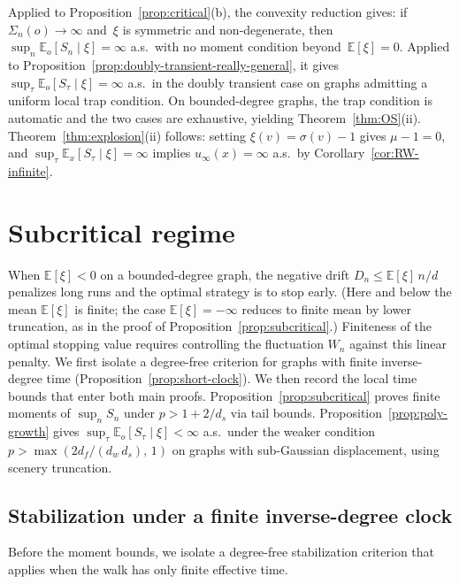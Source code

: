 \documentclass[aop]{imsart}
\theoremstyle{plain}
\theoremstyle{definition}
\newcommand{\E}{\mathbb{E}}
\begin{document}
	Applied to Proposition~\ref{prop:critical}(b), the convexity reduction gives: if~$\Sigma_n(o)\to\infty$ and~$\xi$ is symmetric and non-degenerate, then~$\sup_n\E_o[S_n\mid\xi]=\infty$ a.s.\ with no moment condition beyond~$\E[\xi]=0$.  Applied to Proposition~\ref{prop:doubly-transient-really-general}, it gives~$\sup_\tau\E_o[S_\tau\mid\xi]=\infty$ a.s.\ in the doubly transient case on graphs admitting a uniform local trap condition.  On bounded-degree graphs, the trap condition is automatic and the two cases are exhaustive, yielding Theorem~\ref{thm:OS}(ii).  Theorem~\ref{thm:explosion}(ii) follows: setting $\xi(v)=\sigma(v)-1$ gives $\mu-1=0$, and $\sup_{\tau}\E_x[S_\tau\mid\xi]=\infty$ implies $u_\infty(x)=\infty$ a.s.\ by Corollary~\ref{cor:RW-infinite}.
	
	\section{Subcritical regime}\label{sec:subcritical}
	
	When $\E[\xi]<0$ on a bounded-degree graph, the negative drift $D_n\leq\E[\xi]\,n/d$ penalizes long runs and the optimal strategy is to stop early. (Here and below the mean $\E[\xi]$ is finite; the case $\E[\xi]=-\infty$ reduces to finite mean by lower truncation, as in the proof of Proposition~\ref{prop:subcritical}.) Finiteness of the optimal stopping value requires controlling the fluctuation $W_n$ against this linear penalty. We first isolate a degree-free criterion for graphs with finite inverse-degree time (Proposition~\ref{prop:short-clock}). We then record the local time bounds that enter both main proofs. Proposition~\ref{prop:subcritical} proves finite moments of $\sup_n S_n$ under $p>1+2/d_s$ via tail bounds. Proposition~\ref{prop:poly-growth} gives $\sup_\tau\E_o[S_\tau\mid\xi]<\infty$ a.s.\ under the weaker condition $p>\max(2d_f/(d_w\,d_s),\,1)$ on graphs with sub-Gaussian displacement, using scenery truncation.
	
	\subsection{Stabilization under a finite inverse-degree clock}
	
	Before the moment bounds, we isolate a degree-free stabilization criterion that applies when the walk has only finite effective time.
	
\end{document}
